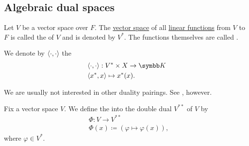 \subsection{Algebraic dual spaces}\label{subsec:algebraic_dual_spaces}

\begin{definition}\label{def:dual_vector_space}
  Let \( V \) be a vector space over \( F \). The \hyperref[thm:functions_over_ring_form_algebra]{vector space} of all \hyperref[def:linear_operator]{linear functions} from \( V \) to \( F \) is called the  of \( V \) and is denoted by \( V^* \). The functions themselves are called .
\end{definition}

\begin{definition}\label{def:canonical_duality_pairing}
  We denote by \( \left\langle \cdot, \cdot \right\rangle \) the 
  \begin{align*}
     & \Prod \cdot \cdot: V^* \times X \to \BK \\
     & \Prod {x^*} x \mapsto x^*(x).
  \end{align*}

  We are usually not interested in other duality pairings. See , however.
\end{definition}

\begin{definition}\label{def:double_dual_canonical_embedding}
  Fix a vector space \( V \). We define the  into the double dual \( V^{**} \) of \( V \) by
  \begin{align*}
     & \Phi: V \to V^{**}                              \\
     & \Phi(x) \coloneqq (\varphi \mapsto \varphi(x)),
  \end{align*}
  where \( \varphi \in V^* \).
\end{definition}

